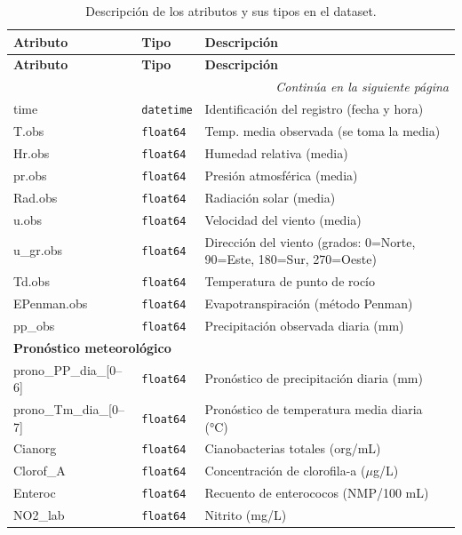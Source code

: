 \documentclass[11pt]{report}
\begin{document}
\begin{longtable}{llp{8cm}}
\caption{Descripción de los atributos y sus tipos en el dataset.} \label{tab:estructura-datos} \\
\hline
\textbf{Atributo} & \textbf{Tipo} & \textbf{Descripción} \\
\hline
\endfirsthead

\hline
\textbf{Atributo} & \textbf{Tipo} & \textbf{Descripción} \\
\hline
\endhead

\hline
\multicolumn{3}{r}{\emph{Continúa en la siguiente página}} \\
\endfoot

\hline
\endlastfoot

time & \texttt{datetime} & Identificación del registro (fecha y hora) \\
T.obs & \texttt{float64} & Temp. media observada (se toma la media) \\
Hr.obs & \texttt{float64} & Humedad relativa (media) \\
pr.obs & \texttt{float64} & Presión atmosférica (media) \\
Rad.obs & \texttt{float64} & Radiación solar (media) \\
u.obs & \texttt{float64} & Velocidad del viento (media) \\
u\_gr.obs & \texttt{float64} & Dirección del viento (grados: 0=Norte, 90=Este, 180=Sur, 270=Oeste) \\
Td.obs & \texttt{float64} & Temperatura de punto de rocío \\
EPenman.obs & \texttt{float64} & Evapotranspiración (método Penman) \\
pp\_obs & \texttt{float64} & Precipitación observada diaria (mm) \\
\hline
\multicolumn{3}{l}{\textbf{Pronóstico meteorológico}} \\
prono\_PP\_dia\_[0–6] & \texttt{float64} & Pronóstico de precipitación diaria (mm) \\
prono\_Tm\_dia\_[0–7] & \texttt{float64} & Pronóstico de temperatura media diaria (°C) \\
\hline
Cianorg & \texttt{float64} & Cianobacterias totales (org/mL) \\
Clorof\_A & \texttt{float64} & Concentración de clorofila-a (\(\mu\)g/L) \\
Enteroc & \texttt{float64} & Recuento de enterococos (NMP/100 mL) \\
NO2\_lab & \texttt{float64} & Nitrito (mg/L) \\

\end{longtable}
\end{document}
